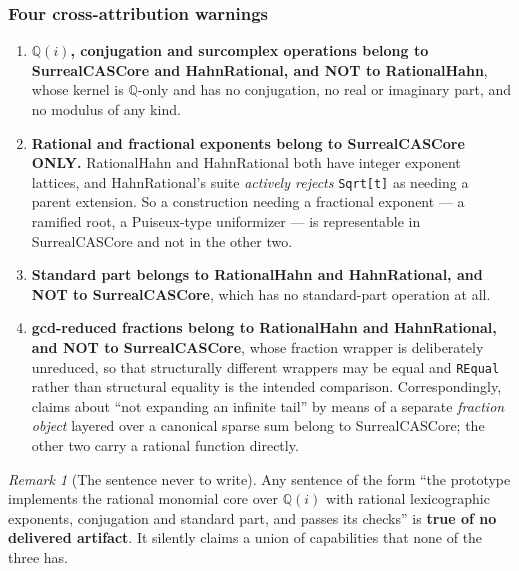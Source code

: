 \documentclass[11pt,letterpaper]{article}
\numberwithin{equation}{section}
\theoremstyle{definition}
\theoremstyle{remark}
\newtheorem{remark}[theorem]{Remark}
\newcommand{\Q}{\mathbb Q}
\begin{document}
\subsubsection{Four cross-attribution warnings}
\label{cas:subsub-crossattribution}
\begin{enumerate}
\item[(a)] \textbf{$\Q(i)$, conjugation and surcomplex operations belong to
SurrealCASCore and HahnRational, and NOT to RationalHahn}, whose kernel is
$\Q$-only and has no conjugation, no real or imaginary part, and no modulus of
any kind.
\item[(b)] \textbf{Rational and fractional exponents belong to SurrealCASCore
ONLY.} RationalHahn and HahnRational both have integer exponent lattices, and
HahnRational's suite \emph{actively rejects} \texttt{Sqrt[t]} as needing a
parent extension. So a construction needing a fractional exponent --- a ramified
root, a Puiseux-type uniformizer --- is representable in SurrealCASCore and not
in the other two.
\item[(c)] \textbf{Standard part belongs to RationalHahn and HahnRational, and
NOT to SurrealCASCore}, which has no standard-part operation at all.
\item[(d)] \textbf{gcd-reduced fractions belong to RationalHahn and
HahnRational, and NOT to SurrealCASCore}, whose fraction wrapper is deliberately
unreduced, so that structurally different wrappers may be equal and
\texttt{REqual} rather than structural equality is the intended comparison.
Correspondingly, claims about ``not expanding an infinite tail'' by means of a
separate \emph{fraction object} layered over a canonical sparse sum belong to
SurrealCASCore; the other two carry a rational function directly.
\end{enumerate}

\begin{remark}[The sentence never to write]\label{cas:rem-neverwrite}
Any sentence of the form ``the prototype implements the rational monomial core
over $\Q(i)$ with rational lexicographic exponents, conjugation and standard
part, and passes its checks'' is \textbf{true of no delivered artifact}. It
silently claims a union of capabilities that none of the three has.
\end{remark}
\end{document}
